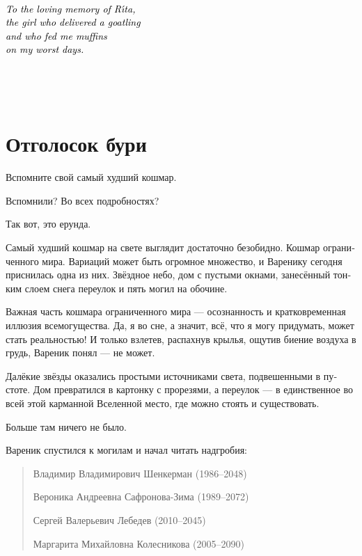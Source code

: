 \documentclass[a5paper,12pt,fleqn]{extbook}\usepackage{cooltooltips}\usepackage{polyglossia}\setdefaultlanguage[babelshorthands=true]{russian}\setotherlanguage{english}\defaultfontfeatures{Ligatures=TeX,Mapping=tex-text} \usepackage{xcolor}\definecolor{lightgray}{HTML}{bbbbbb}\color{lightgray}\newcommand{\ml}[3]{\textenglish{\textcolor{black}{#3}}}
\newcommand{\Rita}{R\'{\i}ta}
\begin{document}
\newpage

\thispagestyle{plain}
{~\par}
\vfill
{\centering\Large\textit{
\ml{$0$}
{Светлой памяти Риты "---\\девочки, которая принимала роды у козы\\и которая кормила меня кексами\\в худшие дни моей жизни.}
{To the loving memory of \Rita,\\the girl who delivered a goatling\\and who fed me muffins\\on my worst days.}
}\par}
\vfill
{~\par}

\newpage
\thispagestyle{plain}
~
\newpage


\pagestyle{fancy}

\chapter{Отголосок бури}

Вспомните свой самый худший кошмар.

Вспомнили?
Во всех подробностях?

Так вот, это ерунда.

Самый худший кошмар на свете выглядит достаточно безобидно.
Кошмар ограниченного мира.
Вариаций может быть огромное множество, и Варенику сегодня приснилась одна из них.
Звёздное небо, дом с пустыми окнами, занесённый тонким слоем снега переулок и пять могил на обочине.

Важная часть кошмара ограниченного мира --- осознанность и кратковременная иллюзия всемогущества.
Да, я во сне, а значит, всё, что я могу придумать, может стать реальностью!
И только взлетев, распахнув крылья, ощутив биение воздуха в грудь, Вареник понял --- не может.

Далёкие звёзды оказались простыми источниками света, подвешенными в пустоте.
Дом превратился в картонку с прорезями, а переулок --- в единственное во всей этой карманной Вселенной место, где можно стоять и существовать.

Больше там ничего не было.

Вареник спустился к могилам и начал читать надгробия:

\begin{quote}
Владимир Владимирович Шенкерман (1986--2048)

Вероника Андреевна Сафронова-Зима (1989--2072)

Сергей Валерьевич Лебедев (2010--2045)

Маргарита Михайловна Колесникова (2005--2090)
\end{quote}
\end{document}
